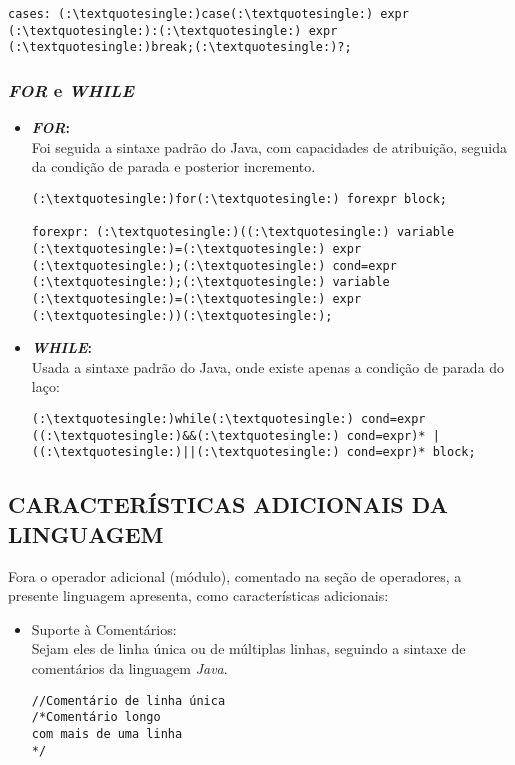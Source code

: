 \begin{itemize}
\begin{itemize}
\begin{lstlisting}
cases: (:\textquotesingle:)case(:\textquotesingle:) expr (:\textquotesingle:):(:\textquotesingle:) expr (:\textquotesingle:)break;(:\textquotesingle:)?;
        				\end{lstlisting}
        		\end{itemize}
        
        \subsubsection{\normalsize \textit{FOR} e \textit{WHILE}}
        		\begin{itemize}
        			\item \textbf{\textit{FOR}:}\\
        				Foi seguida a sintaxe padrão do Java, com capacidades de atribuição, seguida da condição de parada e posterior incremento.
        				
        				\begin{lstlisting}
(:\textquotesingle:)for(:\textquotesingle:) forexpr block;

forexpr: (:\textquotesingle:)((:\textquotesingle:) variable (:\textquotesingle:)=(:\textquotesingle:) expr (:\textquotesingle:);(:\textquotesingle:) cond=expr (:\textquotesingle:);(:\textquotesingle:) variable (:\textquotesingle:)=(:\textquotesingle:) expr (:\textquotesingle:))(:\textquotesingle:);
        				\end{lstlisting}
        				
        			\item \textbf{\textit{WHILE}:}\\
        				Usada a sintaxe padrão do Java, onde existe apenas a condição de parada do laço:
        				\begin{lstlisting}
(:\textquotesingle:)while(:\textquotesingle:) cond=expr ((:\textquotesingle:)&&(:\textquotesingle:) cond=expr)* | ((:\textquotesingle:)||(:\textquotesingle:) cond=expr)* block;
        				\end{lstlisting}
        		\end{itemize}

	\subsection{\normalsize CARACTERÍSTICAS ADICIONAIS DA LINGUAGEM}
            Fora o operador adicional (módulo), comentado na seção de operadores, a presente linguagem apresenta, como características adicionais:
			
			\begin{itemize}
				\item Suporte à Comentários:\\
					Sejam eles de linha única ou de múltiplas linhas, seguindo a sintaxe de comentários da linguagem \textit{Java}.
					\begin{lstlisting}
//Comentário de linha única
/*Comentário longo
com mais de uma linha
*/
					\end{lstlisting}


\end{itemize}
\end{itemize}
